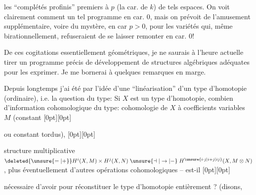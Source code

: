 %
les ``complétés profinis''  premiers à $p$ (la car. de $k$) de tels espaces. On voit clairement comment  un tel programme en car. $0$, mais on prévoit de l'amusement supplémentaire, voire du mystère, en car $p>0$, pour les variétés qui, même birationnellement, refuseraient de se laisser remonter en car. $0$!


De ces cogitations essentiellement géométriques, je ne saurais à l'heure actuelle tirer un programme précis de développement de structures algébriques adéquates pour les exprimer. Je me bornerai à quelques remarques en marge.

 Depuis longtemps j'ai été  par l'idée d'une ``linéarisation'' d'un type d'homotopie (ordinaire), i.e. la question du type: Si $X$ est un type d'homotopie, combien d'information cohomologique du type: cohomologie de $X$ à coefficients variables $M$ (constant%
\raisebox{0pt}[0pt][0pt]{\parbox{0pt}{}} ou constant tordus),
\raisebox{0pt}[0pt][0pt]{\parbox{0pt}{}}structure multiplicative $\deleted{\unsure{=|+}}H^i(X,M)\times H^j(X,N)\mathrel{\unsure{\dashv|\to|-}}H^{\unsure{i\cdot j|i+j|ij}}(X,M\otimes N)$, plus éventuellement d'autres opérations cohomologiques -- est-il%
\raisebox{0pt}[0pt][0pt]{\parbox{0pt}{}} nécessaire d'avoir pour réconstituer le type d'homotopie entièrement ? (disons,
